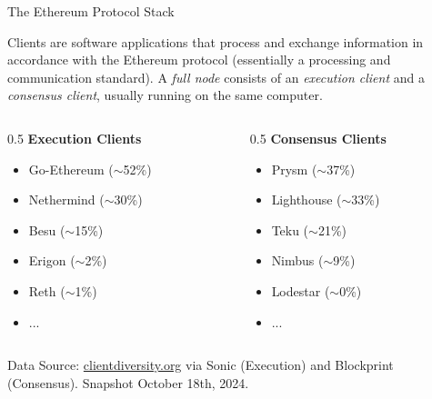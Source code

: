 \documentclass[12pt]{beamer}
\begin{document}
\begin{frame}{The Ethereum Protocol Stack}

Clients are software applications that process and exchange information in accordance with the Ethereum protocol (essentially a processing and communication standard). A \textit{full node} consists of an \textit{execution client} and a \textit{consensus client}, usually running on the same computer. \vspace{0.8em}

    \begin{columns}
        \begin{column}{0.5\textwidth}
            \textbf{Execution Clients}\\
            \begin{itemize}
                \item Go-Ethereum ($\sim$52\%)
                \item Nethermind ($\sim$30\%)
                \item Besu ($\sim$15\%)
                \item Erigon ($\sim$2\%)
                \item Reth ($\sim$1\%)
                \item ...
            \end{itemize}
        \end{column}
        
        \begin{column}{0.5\textwidth}
            \textbf{Consensus Clients}\\
            \begin{itemize}
                \item Prysm ($\sim$37\%)
                \item Lighthouse ($\sim$33\%)
                \item Teku ($\sim$21\%)
                \item Nimbus ($\sim$9\%)
                \item Lodestar ($\sim$0\%)
                \item ...
            \end{itemize}
        \end{column}    
    \end{columns} \vfill
    
    \tiny{Data Source: \url{clientdiversity.org} via Sonic (Execution) and Blockprint (Consensus). Snapshot October 18th, 2024.}

\end{frame}
\end{document}
